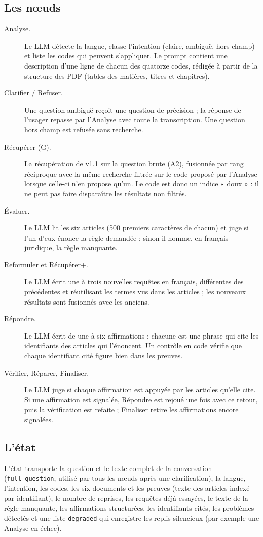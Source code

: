 \subsection{Les nœuds}
\begin{description}
  \item[Analyse.] Le LLM détecte la langue, classe l'intention (claire, ambiguë, hors champ) et liste les codes qui
        peuvent s'appliquer. Le prompt contient une description d'une ligne de chacun des quatorze codes, rédigée à
        partir de la structure des PDF (tables des matières, titres et chapitres).
  \item[Clarifier / Refuser.] Une question ambiguë reçoit une question de précision ; la réponse de l'usager repasse par
        l'Analyse avec toute la transcription. Une question hors champ est refusée sans recherche.
  \item[Récupérer (G).] La récupération de v1.1 sur la question brute (A2), fusionnée par rang réciproque avec la même
        recherche filtrée sur le code proposé par l'Analyse lorsque celle-ci n'en propose qu'un. Le code est donc un
        indice « doux » : il ne peut pas faire disparaître les résultats non filtrés.
  \item[Évaluer.] Le LLM lit les six articles (500 premiers caractères de chacun) et juge si l'un d'eux énonce la règle
        demandée ; sinon il nomme, en français juridique, la règle manquante.
  \item[Reformuler et Récupérer+.] Le LLM écrit une à trois nouvelles requêtes en français, différentes des précédentes et
        réutilisant les termes vus dans les articles ; les nouveaux résultats sont fusionnés avec les anciens.
  \item[Répondre.] Le LLM écrit de une à six affirmations ; chacune est une phrase qui cite les identifiants des articles
        qui l'énoncent. Un contrôle en code vérifie que chaque identifiant cité figure bien dans les preuves.
  \item[Vérifier, Réparer, Finaliser.] Le LLM juge si chaque affirmation est appuyée par les articles qu'elle cite. Si une
        affirmation est signalée, Répondre est rejoué une fois avec ce retour, puis la vérification est refaite ; Finaliser retire
        les affirmations encore signalées.
\end{description}

\subsection{L'état}
L'état transporte la question et le texte complet de la conversation (\texttt{full\_question}, utilisé par tous les nœuds
après une clarification), la langue, l'intention, les codes, les six documents et les preuves (texte des articles indexé
par identifiant), le nombre de reprises, les requêtes déjà essayées, le texte de la règle manquante, les affirmations
structurées, les identifiants cités, les problèmes détectés et une liste \texttt{degraded} qui enregistre les replis
silencieux (par exemple une Analyse en échec).

